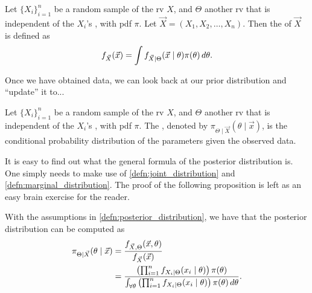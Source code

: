 \documentclass[notoc,notitlepage]{tufte-book}
\begin{document}
\begin{defn}\label{defn:marginal_distribution}
  Let $\{ X_i \}_{i=1}^{n}$ be a random sample of the rv $X$, and $\Theta$ 
  another rv that is independent of the $X_i$'s , with pdf $\pi$. Let
  $\vec{X} = (X_1, X_2, \ldots, X_n)$. Then the  of
  $\vec{X}$ is defined as
  \begin{equation*}
    f_{\vec{X}}(\vec{x}) = \int f_{\vec{X} \mid \Theta}(\vec{x} \mid
    \theta)\pi(\theta) \mathop{}\!d{\theta}.
  \end{equation*}
\end{defn}

Once we have obtained data, we can look back at our prior distribution and
``update'' it to...

\begin{defn}\label{defn:posterior_distribution}
  Let $\{ X_i \}_{i=1}^{n}$ be a random sample of the rv $X$, and $\Theta$ 
  another rv that is independent of the $X_i$'s , with pdf $\pi$.
  The , denoted by $\pi_{\Theta \mid
  \vec{X}}(\theta \mid \vec{x})$, is the conditional probability distribution of
  the parameters given the observed data.
\end{defn}

It is easy to find out what the general formula of the posterior distribution
is. One simply needs to make use of \cref{defn:joint_distribution} and
\cref{defn:marginal_distribution}. The proof of the following proposition is
left as an easy brain exercise for the reader. 

\begin{propo}\label{propo:formula_for_the_posterior_distribution}
  With the assumptions in \cref{defn:posterior_distribution}, we have that the
  posterior distribution can be computed as
  \begin{align*}
    \pi_{\Theta \mid \vec{X}}(\theta \mid \vec{x})
    &= \frac{f_{\vec{X}, \Theta}(\vec{x}, \theta)}{f_{\vec{X}}(\vec{x})} \\
    &= \frac{\left( \prod_{i=1}^{n} f_{X_i \mid \Theta}(x_i \mid \theta) \right)
      \pi(\theta)}{\int_{\forall \theta} \left( \prod_{i=1}^{n} f_{X_i \mid
      \Theta}(x_i \mid \theta) \right) \pi(\theta) \mathop{}\!d{\theta}}.
  \end{align*}
\end{propo}
\end{document}
